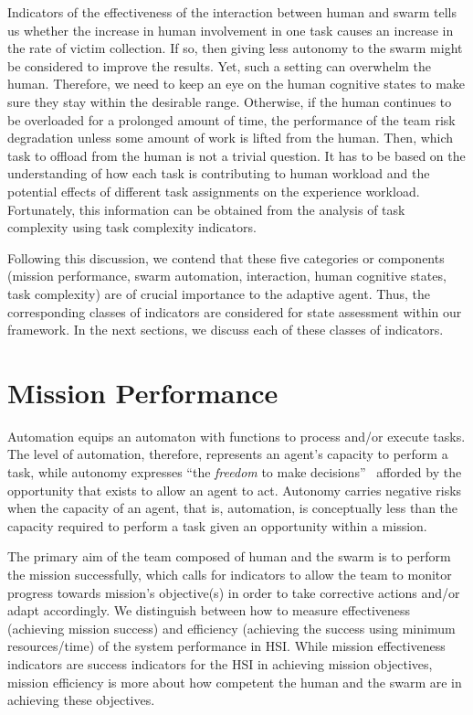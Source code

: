 \documentclass[journal]{IEEEtran}
\begin{document}
Indicators of the effectiveness of the interaction between human and swarm tells us whether the increase in human involvement in one task causes an increase in the rate of victim collection. If so, then giving less autonomy to the swarm might be considered to improve the results. Yet, such a setting can overwhelm the human. Therefore, we need to keep an eye on the human cognitive states to make sure they stay within the desirable range.  Otherwise, if the human continues to be overloaded for a prolonged amount of time, the performance of the team risk degradation unless some amount of work is lifted from the human. Then, which task to offload from the human is not a trivial question. It has to be based on the understanding of how each task is contributing to human workload and the potential effects of different task assignments on the experience workload. Fortunately, this information can be obtained from the analysis of task complexity using task complexity indicators. 

Following this discussion, we contend that these five categories or components (mission performance, swarm automation, interaction, human cognitive states, task complexity) are of crucial importance to the adaptive agent. Thus, the corresponding classes of indicators are considered for state assessment within our framework. In the next sections, we discuss each of these classes of indicators.

\section{Mission Performance}\label{performance}
Automation equips an automaton with functions to process and/or execute tasks. The level of automation, therefore, represents an agent\textquoteright s capacity to perform a task, while autonomy expresses \enquote{the \textit{freedom} to make decisions}~\cite{abbass2016trusted} afforded by the opportunity that exists to allow an agent to act. Autonomy carries negative risks when the capacity of an agent, that is, automation, is conceptually less than the capacity required to perform a task given an opportunity within a mission. %

The primary aim of the team composed of human and the swarm is to perform the mission successfully, which calls for indicators to allow the team to monitor progress towards mission\textquoteright s objective(s) in order to take corrective actions and/or adapt accordingly. We distinguish between how to measure effectiveness (achieving mission success) and efficiency (achieving the success using minimum resources/time) of the system performance in HSI.  While mission effectiveness indicators are success indicators for the HSI in achieving mission objectives, mission efficiency is more about how competent the human and the swarm are in achieving these objectives.
\end{document}
